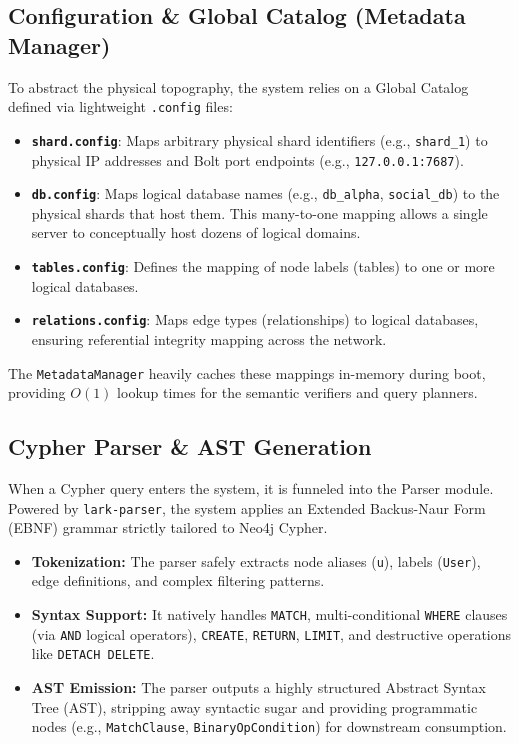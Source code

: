 \documentclass{article}
\begin{document}
\subsection{Configuration \& Global Catalog (Metadata Manager)}
To abstract the physical topography, the system relies on a Global Catalog defined via lightweight \texttt{.config} files:
\begin{itemize}
    \item \textbf{\texttt{shard.config}}: Maps arbitrary physical shard identifiers (e.g., \texttt{shard\_1}) to physical IP addresses and Bolt port endpoints (e.g., \texttt{127.0.0.1:7687}).
    \item \textbf{\texttt{db.config}}: Maps logical database names (e.g., \texttt{db\_alpha}, \texttt{social\_db}) to the physical shards that host them. This many-to-one mapping allows a single server to conceptually host dozens of logical domains.
    \item \textbf{\texttt{tables.config}}: Defines the mapping of node labels (tables) to one or more logical databases.
    \item \textbf{\texttt{relations.config}}: Maps edge types (relationships) to logical databases, ensuring referential integrity mapping across the network.
\end{itemize}
The \texttt{MetadataManager} heavily caches these mappings in-memory during boot, providing \(O(1)\) lookup times for the semantic verifiers and query planners.

\subsection{Cypher Parser \& AST Generation}
When a Cypher query enters the system, it is funneled into the Parser module. Powered by \texttt{lark-parser}, the system applies an Extended Backus-Naur Form (EBNF) grammar strictly tailored to Neo4j Cypher.
\begin{itemize}
    \item \textbf{Tokenization:} The parser safely extracts node aliases (\texttt{u}), labels (\texttt{User}), edge definitions, and complex filtering patterns.
    \item \textbf{Syntax Support:} It natively handles \texttt{MATCH}, multi-conditional \texttt{WHERE} clauses (via \texttt{AND} logical operators), \texttt{CREATE}, \texttt{RETURN}, \texttt{LIMIT}, and destructive operations like \texttt{DETACH DELETE}.
    \item \textbf{AST Emission:} The parser outputs a highly structured Abstract Syntax Tree (AST), stripping away syntactic sugar and providing programmatic nodes (e.g., \texttt{MatchClause}, \texttt{BinaryOpCondition}) for downstream consumption.
\end{itemize}
\end{document}
